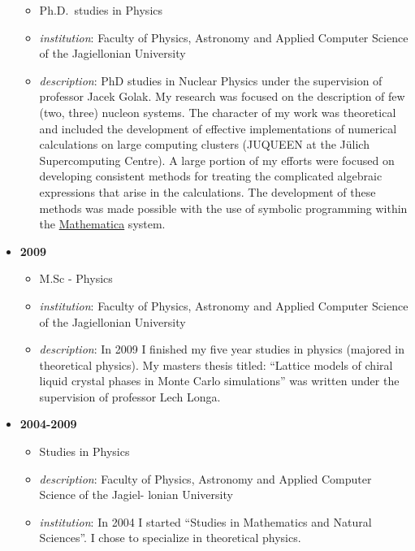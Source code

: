 \begin{itemize}
  \begin{itemize}
  \tightlist
  \item
    Ph.D.~studies in Physics
  \item
    \emph{institution}: Faculty of Physics, Astronomy and Applied
    Computer Science of the Jagiellonian University
  \item
    \emph{description}: PhD studies in Nuclear Physics under the
    supervision of professor Jacek Golak. My research was focused on the
    description of few (two, three) nucleon systems. The character of my
    work was theoretical and included the development of effective
    implementations of numerical calculations on large computing
    clusters (JUQUEEN at the Jülich Supercomputing Centre). A large
    portion of my efforts were focused on developing consistent methods
    for treating the complicated algebraic expressions that arise in the
    calculations. The development of these methods was made possible
    with the use of symbolic programming within the
    \href{https://www.wolfram.com/mathematica/}{Mathematica} system.
  \end{itemize}
\item
  \textbf{2009}

  \begin{itemize}
  \tightlist
  \item
    M.Sc - Physics
  \item
    \emph{institution}: Faculty of Physics, Astronomy and Applied
    Computer Science of the Jagiellonian University
  \item
    \emph{description}: In 2009 I finished my five year studies in
    physics (majored in theoretical physics). My masters thesis titled:
    ``Lattice models of chiral liquid crystal phases in Monte Carlo
    simulations'' was written under the supervision of professor Lech
    Longa.
  \end{itemize}
\item
  \textbf{2004-2009}

  \begin{itemize}
  \tightlist
  \item
    Studies in Physics
  \item
    \emph{description}: Faculty of Physics, Astronomy and Applied
    Computer Science of the Jagiel- lonian University
  \item
    \emph{institution}: In 2004 I started ``Studies in Mathematics and
    Natural Sciences''. I chose to specialize in theoretical physics.
  \end{itemize}
\end{itemize}

